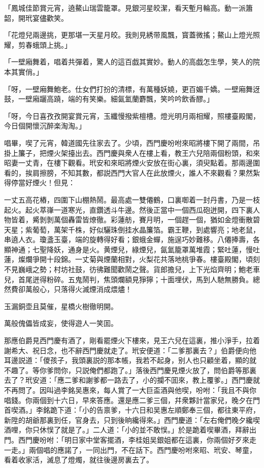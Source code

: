 \begin{myquote}
「鳳城佳節賞元宵，遶鰲山瑞雲籠罩。見銀河星皎潔，看天塹月輪高。動一派簫韶，開玳宴儘歡笑。

\setlength{\hangindent}{4em}
「花燈兒兩邊挑，更那堪一天星月皎。我則見綉带風飄，寳蓋微搖；鰲山上燈光照耀，剪春蛾頭上挑。」

\setlength{\hangindent}{4em}
「一壁廂舞着，唱着共彈着，驚人的這百戯其實妙。動人的高戯怎生學，笑人的院本其實俏。」

\setlength{\hangindent}{4em}
「呀，一壁廂舞鮑老。仕女們打扮的清標，有萬種妖嬈，更百媚千嬌。一壁廂舞迓鼓，一壁廂躧高蹺，端的有笑樂。細氤氳蘭麝飄，笑吟吟飲香醪。」

\setlength{\hangindent}{4em}
「呀，今日喜孜孜開宴賞元宵，玉纖慢撥紫檀槽。燈光明月兩相耀，照樓臺殿閣，今日個開懷沉醉楽淘淘。」
\end{myquote}

唱畢，喫了元宵，韓道國先往家去了。少頃，西門慶吩咐來昭將樓下開了兩間，吊掛上簾子，把煙火架擡出去。西門慶與衆人在樓上看，教王六兒陪兩個粉頭，和來昭妻一丈青，在樓下觀看。玳安和來昭將煙火安放在街心裏，須臾點着。那兩邊圍看的，挨肩擦膀，不知其數，都説西門大官人在此放煙火，誰人不來觀看？果然紮得停當好煙火！但見：

一丈五高花樁，四圍下山棚熱鬧。最高處一雙僊鶴，口裏啣着一封丹書，乃是一枝起火。起火萃嵂一道寒光，直鑽透斗牛邊。然後正當中一個西瓜砲迸開，四下裏人物皆着，觱剝剝萬個轟雷皆燎徹。彩蓮舫，賽月明，一個趕一個，猶如金燈衝散碧天星；紫葡萄，萬架千株，好似驪珠倒挂水晶簾箔。霸王鞭，到處響亮；地老鼠，串遶人衣。瓊盞玉臺，端的旋轉得好看；銀蛾金蟬，施逞巧妙難移。八僊捧壽，各顯神通；七聖降妖，通身是火。黄煙兒，綠煙兒，氤氳籠罩萬堆霞；緊吐蓮，慢吐蓮，燦爛爭開十段錦。一丈菊與煙蘭相對，火梨花共落地桃爭春。樓臺殿閣，頃刻不見巍峨之勢；村坊社鼓，彷彿難聞歡鬧之聲。貨郎擔兒，上下光焰齊明；鮑老車兒，首尾迸得粉碎。五鬼鬧判，焦頭爛額見猙獰；十面埋伏，馬到人馳無勝負。總然費卻萬般心，只落得火滅煙消成煨燼！

\begin{myquote}
玉漏銅壶且莫催，星橋火樹徹明開。

萬般傀儡皆成妄，使得遊人一笑囬。
\end{myquote}

那應伯爵見西門慶有酒了，剛看罷煙火下樓來，見王六兒在這裏，推小淨手，拉着謝希大、祝日念，也不辭西門慶就走了。玳安便道：「二爹那裏去？」伯爵便向他耳邊説道：「儍孩子，我頭裏説的那本帳，我若不起身，别人也只顧坐着，顯的就不趣了。等你爹問你，只説俺們都跑了。」落後西門慶見煙火放了，問伯爵等那裏去了？玳安道：「應二爹和謝爹都一路去了，小的攔不囬來，教上覆爹。」西門慶就不再問了。因叫過李銘吴惠來，每人賞了一大巨盃酒與他喫，吩咐：「我且不與你唱錢。你兩個到十六日，早來答應。還是應二爹三個，幷衆夥計當家兒，晚夕在門首喫酒。」李銘跪下道：「小的告禀爹，十六日和吴惠左順鄭奉三個，都往東平府，新陞的胡爺那裏到任，官身去，只到後晌纔得來。」西門慶道：「左右俺們晚夕纔喫酒哩，你只休悮了就是了。」二人道：「小的並不敢悮。」於是跪着喫畢酒，拜辭出門。西門慶吩咐：「明日家中堂客擺酒，李桂姐吴銀姐都在這裏，你兩個好歹來走一走。」兩個唱的應諾了，一同出門，不在話下。西門慶吩咐來昭、玳安、琴童，看着收家活，滅息了燈燭，就往後邊房裏去了。

